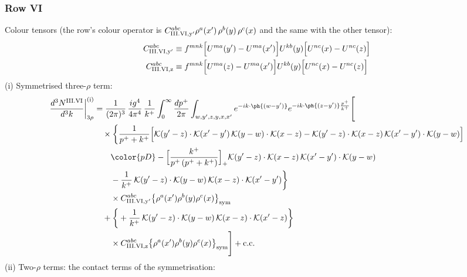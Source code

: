 \subsubsection*{Row VI}
Colour tensors (the row's colour operator is $C^{abc}_{{\rm III.VI,y'}}\rho^{a}(x')\,\rho^{b}(y)\,\rho^{c}(x)$ and the same with the other tensor):
\begin{align}
C^{abc}_{{\rm III.VI,y'}}&\equiv f^{mnk}\Big[U^{ma}(y')-U^{ma}(x')\Big]U^{kb}(y)\Big[U^{nc}(x)-U^{nc}(z)\Big]\notag\\
C^{abc}_{{\rm III.VI,z}}&\equiv f^{mnk}\Big[U^{ma}(z)-U^{ma}(x')\Big]U^{kb}(y)\Big[U^{nc}(x)-U^{nc}(z)\Big]\notag
\end{align}
(i) Symmetrised three-$\rho$ term:
\begin{align}
\frac{d^{3}N^{\rm III.VI}}{d^{3}k}\bigg|^{\rm (i)}_{3\rho}&=\frac{1}{(2\pi)^{3}}\,\frac{ig^{4}}{4\pi^{4}}\,\frac{1}{k^{+}}\int_{0}^{\infty}\frac{dp^{+}}{2\pi}\int_{w,y',z,y,x,x'}e^{-ik\cdot\ph{(w-y')}}e^{-ik\cdot\ph{(z-y')}\frac{p^{+}}{k^{+}}}\Bigg[\notag\\
&\quad\times\bigg\{\frac{1}{p^{+}+k^{+}}\Big[\mathcal{K}(y'-z)\cdot\mathcal{K}(x'-y')\,\mathcal{K}(y-w)\cdot\mathcal{K}(x-z)-\mathcal{K}(y'-z)\cdot\mathcal{K}(x-z)\,\mathcal{K}(x'-y')\cdot\mathcal{K}(y-w)\Big]\notag\\
&\qquad{\color{pD}-\Big[\frac{k^{+}}{p^{+}\,(p^{+}+k^{+})}\Big]_{+}\mathcal{K}(y'-z)\cdot\mathcal{K}(x-z)\,\mathcal{K}(x'-y')\cdot\mathcal{K}(y-w)}\notag\\
&\qquad-\frac{1}{k^{+}}\,\mathcal{K}(y'-z)\cdot\mathcal{K}(y-w)\,\mathcal{K}(x-z)\cdot\mathcal{K}(x'-y')\bigg\}\notag\\
&\qquad\times C^{abc}_{{\rm III.VI,y'}}\big\{\rho^{a}(x')\rho^{b}(y)\rho^{c}(x)\big\}_{\rm sym}\notag\\
&\quad+\bigg\{+\frac{1}{k^{+}}\,\mathcal{K}(y'-z)\cdot\mathcal{K}(y-w)\,\mathcal{K}(x-z)\cdot\mathcal{K}(x'-z)\bigg\}\notag\\
&\qquad\times C^{abc}_{{\rm III.VI,z}}\big\{\rho^{a}(x')\rho^{b}(y)\rho^{c}(x)\big\}_{\rm sym}\Bigg]+{\rm c.c.}\label{eq:D-III.VI-3}
\end{align}
(ii) Two-$\rho$ terms: the contact terms of the symmetrisation:
